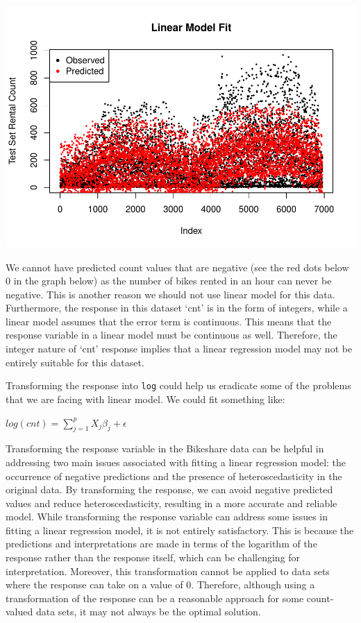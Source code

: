 \documentclass[
]{article}
\begin{document}
\includegraphics{test_files/figure-latex/unnamed-chunk-8-1.pdf}

We cannot have predicted count values that are negative (see the red
dots below 0 in the graph below) as the number of bikes rented in an
hour can never be negative. This is another reason we should not use
linear model for this data. Furthermore, the response in this dataset
`cnt' is in the form of integers, while a linear model assumes that the
error term is continuous. This means that the response variable in a
linear model must be continuous as well. Therefore, the integer nature
of `cnt' response implies that a linear regression model may not be
entirely suitable for this dataset.

Transforming the response into \texttt{log} could help us eradicate some
of the problems that we are facing with linear model. We could fit
something like:

\(log(cnt) = \sum\limits_{j=1} ^ {p} X_{j}\beta_{j} + \epsilon\)

Transforming the response variable in the Bikeshare data can be helpful
in addressing two main issues associated with fitting a linear
regression model: the occurrence of negative predictions and the
presence of heteroscedasticity in the original data. By transforming the
response, we can avoid negative predicted values and reduce
heteroscedasticity, resulting in a more accurate and reliable model.
While transforming the response variable can address some issues in
fitting a linear regression model, it is not entirely satisfactory. This
is because the predictions and interpretations are made in terms of the
logarithm of the response rather than the response itself, which can be
challenging for interpretation. Moreover, this transformation cannot be
applied to data sets where the response can take on a value of 0.
Therefore, although using a transformation of the response can be a
reasonable approach for some count-valued data sets, it may not always
be the optimal solution.
\end{document}
